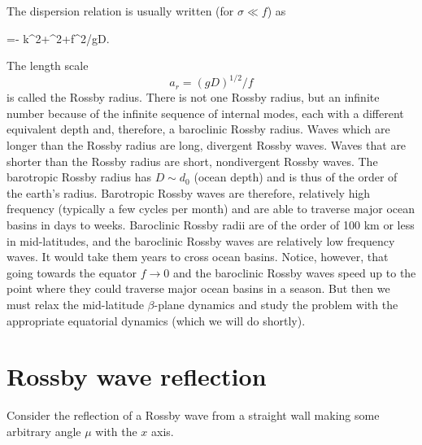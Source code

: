 The dispersion relation is usually written (for $\sigma\ll f$) as
\begin{waveequation}
	\sigma=-
	{k^2+\ell^2+f^2/gD}.
\end{waveequation}

\sourcepagebreak

The length scale
\[
	a_r=(gD)^{1/2}/f
\]
is called the Rossby radius. There is not one Rossby radius, but an infinite number
because of the infinite sequence of internal modes, each with a different equivalent
depth and, therefore, a baroclinic Rossby radius. Waves which are longer than the
Rossby radius are long, divergent Rossby waves. Waves that are shorter than the Rossby
radius are short, nondivergent Rossby waves. The barotropic Rossby radius has
$D\sim d_0$ (ocean depth) and is thus of the order of the earth's radius. Barotropic
Rossby waves are therefore, relatively high frequency (typically a few cycles per
month) and are able to traverse major ocean basins in days to weeks. Baroclinic Rossby
radii are of the order of 100 km or less in mid-latitudes, and the baroclinic Rossby
waves are relatively low frequency waves. It would take them years to cross ocean
basins. Notice, however, that going towards the equator $f\to0$ and the baroclinic
Rossby waves speed up to the point where they could traverse major ocean basins in a
season. But then we must relax the mid-latitude $\beta$-plane dynamics and study the
problem with the appropriate equatorial dynamics (which we will do shortly).

\section{Rossby wave reflection}

Consider the reflection of a Rossby wave from a straight wall making some arbitrary
angle $\mu$ with the $x$ axis.



